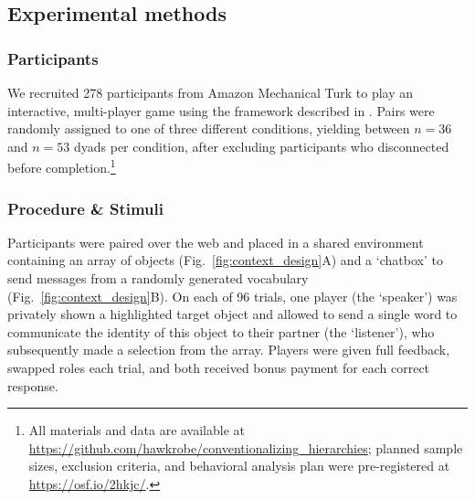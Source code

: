 			
\subsection{Experimental methods}

\subsubsection{Participants}

We recruited 278 participants from Amazon Mechanical Turk to play an interactive, multi-player game using the framework described in . Pairs were randomly assigned to one of three different conditions, yielding between $n=36$ and $n=53$ dyads per condition, after excluding participants who disconnected before completion.\footnote{All materials and data are available at \url{https://github.com/hawkrobe/conventionalizing_hierarchies}; planned sample sizes, exclusion criteria, and behavioral analysis plan were pre-registered at \url{https://osf.io/2hkjc/}.}

\subsubsection{Procedure \& Stimuli}
Participants were paired over the web and placed in a shared environment containing an array of objects (Fig.\ \ref{fig:context_design}A) and a `chatbox' to send messages from a randomly generated vocabulary (Fig.\ \ref{fig:context_design}B). On each of 96 trials, one player (the `speaker') was privately shown a highlighted target object and allowed to send a single word to communicate the identity of this object to their partner (the `listener'), who subsequently made a selection from the array. Players were given full feedback, swapped roles each trial, and both received bonus payment for each correct response.

